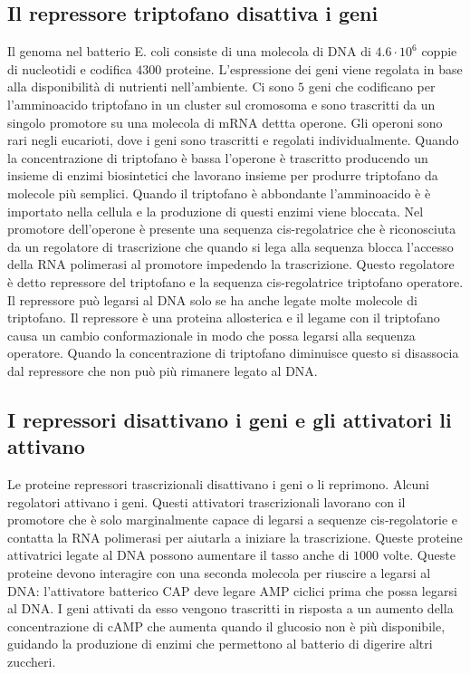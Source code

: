 \subsection{Il repressore triptofano disattiva i geni}
Il genoma nel batterio E. coli consiste di una molecola di DNA di $4.6\cdot 10^6$ coppie di nucleotidi e codifica $4300$ proteine. L'espressione dei geni viene regolata in base alla
disponibilit\`a di nutrienti nell'ambiente. Ci sono $5$ geni che codificano per l'amminoacido triptofano in un cluster sul cromosoma e sono trascritti da un singolo promotore su una 
molecola di mRNA dettta operone. Gli operoni sono rari negli eucarioti, dove i geni sono trascritti e regolati individualmente. Quando la concentrazione di triptofano \`e bassa l'operone
\`e trascritto producendo un insieme di enzimi biosintetici che lavorano insieme per produrre triptofano da molecole pi\`u semplici. Quando il triptofano \`e abbondante l'amminoacido \`e
\`e importato nella cellula e la produzione di questi enzimi viene bloccata. Nel promotore dell'operone \`e presente una sequenza cis-regolatrice che \`e riconosciuta da un regolatore 
di trascrizione che quando si lega alla sequenza blocca l'accesso della RNA polimerasi al promotore impedendo la trascrizione. Questo regolatore \`e detto repressore del triptofano
e la sequenza cis-regolatrice triptofano operatore. Il repressore pu\`o legarsi al DNA solo se ha anche legate molte molecole di triptofano. Il repressore \`e una proteina allosterica e 
il legame con il triptofano causa un cambio conformazionale in modo che possa legarsi alla sequenza operatore. Quando la concentrazione di triptofano diminuisce questo si disassocia dal
repressore che non pu\`o pi\`u rimanere legato al DNA.
\subsection{I repressori disattivano i geni e gli attivatori li attivano}
Le proteine repressori trascrizionali disattivano i geni o li reprimono. Alcuni regolatori attivano i geni. Questi attivatori trascrizionali lavorano con il promotore che \`e solo 
marginalmente capace di legarsi a sequenze cis-regolatorie e contatta la RNA polimerasi per aiutarla a iniziare la trascrizione. Queste proteine attivatrici legate al DNA possono 
aumentare il tasso anche di $1000$ volte. Queste proteine devono interagire con una seconda molecola per riuscire a legarsi al DNA: l'attivatore batterico CAP deve legare AMP ciclici 
prima che possa legarsi al DNA. I geni attivati da esso vengono trascritti in risposta a un aumento della concentrazione di cAMP che aumenta quando il glucosio non \`e pi\`u disponibile,
guidando la produzione di enzimi che permettono al batterio di digerire altri zuccheri. 
